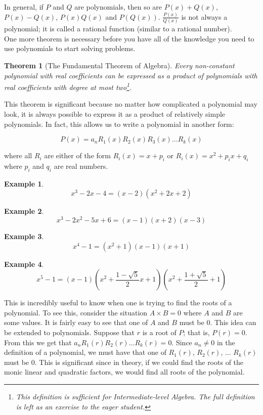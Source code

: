 \documentclass[a4paper,12pt]{article}
\newtheorem{example}{Example}[section]
\newtheorem{theorem}{Theorem}[section]
\begin{document}
In general, if $P$ and $Q$ are polynomials, then so are $P(x) + Q(x)$, $P(x) - Q(x)$, $P(x)Q(x)$ and $P(Q(x))$. $\frac{P(x)}{Q(x)}$ is not always a polynomial; it is called a rational function (similar to a rational number). \\

One more theorem is necessary before you have all of the knowledge you need to use polynomials to start solving problems. \\

\begin{theorem}[The Fundamental Theorem of Algebra] 
    Every non-constant polynomial with real coefficients can be expressed as a product of polynomials with real coefficients with degree at most two\footnote{This definition is sufficient for Intermediate-level Algebra. The full definition is left as an exercise to the eager student.}.
\end{theorem}

This theorem is significant because no matter how complicated a polynomial may look, it is always possible to express it as a product of relatively simple polynomials. In fact, this allows us to write a polynomial in another form:

$$P(x) = a_nR_1(x)R_2(x)R_3(x)...R_k(x)$$

where all $R_i$ are either of the form $R_i(x) = x + p_i$ or $R_i(x) = x^2 + p_ix + q_i$ where $p_i$ and $q_i$ are real numbers. \\

\begin{example}
    $$x^3 - 2x - 4 = (x - 2)(x^2 + 2x + 2)$$
\end{example}
\begin{example}
    $$x^3 - 2x^2 - 5x + 6 = (x - 1)(x + 2)(x - 3)$$
\end{example}
\begin{example}
    $$x^4 - 1 = (x^2 + 1)(x - 1)(x + 1)$$
\end{example}
\begin{example}
    $$x^5 - 1 = (x - 1)(x^2 + \frac{1 - \sqrt{5}}{2}x + 1)(x^2 + \frac{1 + \sqrt{5}}{2} + 1)$$
\end{example}

This is incredibly useful to know when one is trying to find the roots of a polynomial. To see this, consider the situation $A \times B = 0$ where $A$ and $B$ are some values. It is fairly easy to see that one of $A$ and $B$ must be $0$. This idea can be extended to polynomials. Suppose that $r$ is a root of $P$; that is, $P(r) = 0$. From this we get that $a_nR_1(r)R_2(r)...R_k(r) = 0$. Since $a_n \neq 0$ in the definition of a polynomial, we must have that one of $R_1(r)$, $R_2(r)$, ... $R_k(r)$ must be $0$. This is significant since in theory, if we could find the roots of the monic linear and quadratic factors, we would find all roots of the polynomial.
\end{document}
